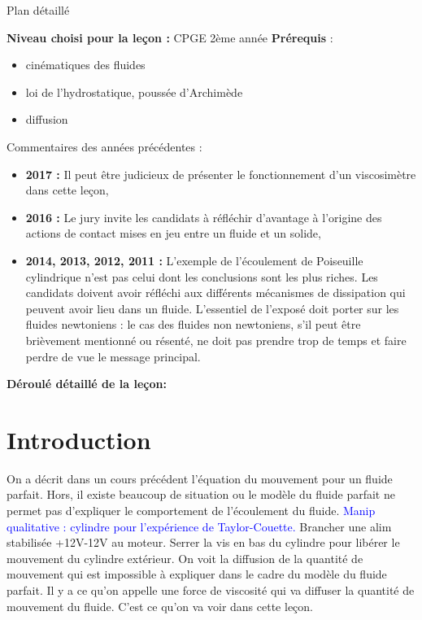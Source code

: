 \begin{reportBlock}{Plan détaillé}

  \textbf{Niveau choisi pour la leçon :} CPGE 2ème année
  \newline
  \textbf{Prérequis} : \begin{itemize}
  \item cinématiques des fluides
      \item loi de l'hydrostatique, poussée d'Archimède
      \item diffusion
  \end{itemize}

  \begin{reportBlock}{Commentaires des années précédentes :}
    \begin{itemize}
        \item \textbf{2017 :} Il peut être judicieux de présenter le fonctionnement d’un viscosimètre dans cette leçon,
        \item \textbf{2016 :} Le jury invite les candidats à réfléchir d’avantage à l’origine des actions de contact mises en jeu entre un fluide et un solide,
        \item \textbf{2014, 2013, 2012, 2011 :} L’exemple de l’écoulement de Poiseuille cylindrique n’est pas celui dont les conclusions sont les plus riches. Les candidats doivent avoir réfléchi aux différents mécanismes de dissipation qui peuvent avoir lieu dans un fluide. L’essentiel de l’exposé doit porter sur les fluides newtoniens : le cas des fluides non newtoniens, s’il peut être brièvement mentionné ou résenté, ne doit pas prendre trop de temps et faire perdre de vue le message principal.
    \end{itemize}
\end{reportBlock}

  \textbf{Déroulé détaillé de la leçon: }  
  
  \section*{Introduction}
  On a décrit dans un cours précédent l'équation du mouvement pour un fluide parfait. Hors, il existe beaucoup de situation ou le modèle du fluide parfait ne permet pas d'expliquer le comportement de l'écoulement du fluide. \textcolor{blue}{Manip qualitative : cylindre pour l'expérience de Taylor-Couette.} Brancher une alim stabilisée +12V-12V au moteur. Serrer la vis en bas du cylindre pour libérer le mouvement du cylindre extérieur. On voit la diffusion de la quantité de mouvement qui est impossible à expliquer dans le cadre du modèle du fluide parfait. Il y a ce qu'on appelle une force de viscosité qui va diffuser la quantité de mouvement du fluide. C'est ce qu'on va voir dans cette leçon.


\end{reportBlock}
